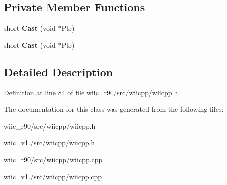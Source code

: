 \subsection*{Private Member Functions}
\begin{DoxyCompactItemize}
\item 
\hypertarget{class_c_nunchuk_buttons_a1fa701dac6b81d6bf8da7ed3b88ac0a1}{short {\bfseries Cast} (void $\ast$Ptr)}\label{class_c_nunchuk_buttons_a1fa701dac6b81d6bf8da7ed3b88ac0a1}

\item 
\hypertarget{class_c_nunchuk_buttons_a1fa701dac6b81d6bf8da7ed3b88ac0a1}{short {\bfseries Cast} (void $\ast$Ptr)}\label{class_c_nunchuk_buttons_a1fa701dac6b81d6bf8da7ed3b88ac0a1}

\end{DoxyCompactItemize}


\subsection{Detailed Description}


Definition at line 84 of file wiic\-\_\-r90/src/wiicpp/wiicpp.\-h.



The documentation for this class was generated from the following files\-:\begin{DoxyCompactItemize}
\item 
wiic\-\_\-r90/src/wiicpp/wiicpp.\-h\item 
wiic\-\_\-v1./src/wiicpp/wiicpp.\-h\item 
wiic\-\_\-r90/src/wiicpp/wiicpp.\-cpp\item 
wiic\-\_\-v1./src/wiicpp/wiicpp.\-cpp\end{DoxyCompactItemize}
